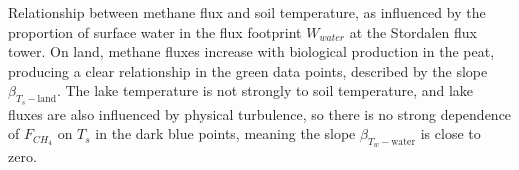 \label{fig:Fch4vsT_byWwater_Stor} Relationship between methane
flux and soil temperature, as influenced by the proportion of surface
water in the flux footprint \(W_{water}\) at the Stordalen flux tower.
On land, methane fluxes increase with biological production in the peat,
producing a clear relationship in the green data points, described by
the slope \(\beta_{T_{s}-\mathrm{land}}\). The lake temperature is not
strongly to soil temperature, and lake fluxes are also influenced by
physical turbulence, so there is no strong dependence of \(F_{CH_4}\) on
\(T_s\) in the dark blue points, meaning the slope
\(\beta_{T_{w}-\mathrm{water}}\) is close to zero.